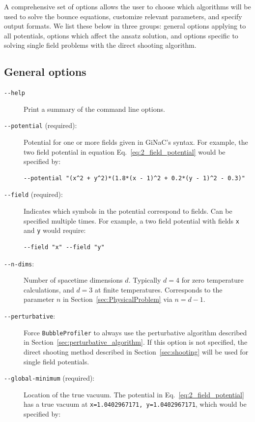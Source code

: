 \documentclass[final,3p,11pt,pdflatex]{elsarticle}
\makeatletter
\newcommand{\bp}{\texttt{BubbleProfiler}\@\xspace}
\newcommand{\code}[1]{\ifmmode\text{\nolinkurl{#1}}\else\nolinkurl{#1}\fi}
\newcommand{\secref}[1]{Section~\ref{#1}}
\renewcommand{\refeq}[1]{Eq.~\ref{#1}}
\makeatother
\begin{document}
A comprehensive set of options allows the user to choose which algorithms will
be used to solve the bounce equations, customize relevant parameters, and
specify output formats. We list these below in three groups: general options
applying to all potentials, options which affect the ansatz solution, and
options specific to solving single field problems with the direct shooting
algorithm.

\subsection{General options}

\begin{description}
\item[\texttt{-\/-help}] Print a summary of the command line options.

\item[\texttt{-\/-potential} (required):] Potential for one or more fields given
  in GiNaC's \cite{BauerIntroductionGiNaCFramework2002} syntax. For example,
  the two field potential in equation \refeq{eq:2_field_potential} would be
  specified by:

\begin{lstlisting}
--potential "(x^2 + y^2)*(1.8*(x - 1)^2 + 0.2*(y - 1)^2 - 0.3)"
\end{lstlisting}

\item[\texttt{-\/-field} (required):] Indicates which symbols in the potential
  correspond to fields. Can be specified multiple times. For example, a
  two field potential with fields \code{x} and \code{y} would require:

\begin{lstlisting}
--field "x" --field "y"
\end{lstlisting}

\item[\texttt{-\/-n-dims}:] Number of spacetime dimensions $d$. Typically
  $d = 4$ for zero temperature calculations, and $d = 3$ at finite
  temperatures. Corresponds to the parameter $n$ in
  \secref{sec:PhysicalProblem} via $n = d - 1$.

\item[\texttt{-\/-perturbative}:] Force \bp to always use the perturbative
  algorithm described in \secref{sec:perturbative_algorithm}. If this option
  is not specified, the direct shooting method described in
  \secref{sec:shooting} will be used for single field potentials.

\item[\texttt{-\/-global-minimum} (required): ] Location of the true vacuum.
  The potential in \refeq{eq:2_field_potential} has a true vacuum at
  \code{x=1.0402967171, y=1.0402967171}, which would be specified by:


\end{description}
\end{document}
